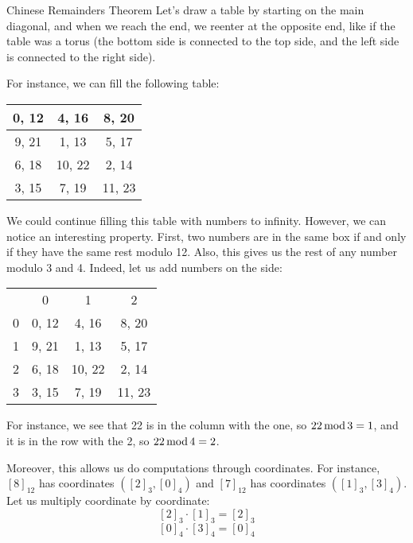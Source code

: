 \documentclass[a4paper]{article}
\begin{document}
\begin{parag}{Chinese Remainders Theorem}
    Let's draw a table by starting on the main diagonal, and when we reach the end, we reenter at the opposite end, like if the table was a torus (the bottom side is connected to the top side, and the left side is connected to the right side).

    For instance, we can fill the following table:
    \begin{center}
    \begin{tabular}{|c|c|c|}
        \hline
        0, 12 & 4, 16 & 8, 20  \\
        \hline
        9, 21 & 1, 13 & 5, 17 \\
        \hline
        6, 18 & 10, 22 & 2, 14 \\
        \hline
        3, 15 & 7, 19 & 11, 23 \\
        \hline
    \end{tabular}
    \end{center}

    We could continue filling this table with numbers to infinity. However, we can notice an interesting property. First, two numbers are in the same box if and only if they have the same rest modulo 12. Also, this gives us the rest of any number modulo 3 and 4. Indeed, let us add numbers on the side:
    \begin{center}
    \begin{tabular}{c||c|c|c|}
        & 0 & 1 & 2  \\
        \hhline{=#=|=|=|}
        0 & 0, 12 & 4, 16 & 8, 20  \\
        \hline
        1 & 9, 21 & 1, 13 & 5, 17 \\
        \hline
        2 & 6, 18 & 10, 22 & 2, 14 \\
        \hline
        3 & 3, 15 & 7, 19 & 11, 23 \\
        \hline
    \end{tabular}
    \end{center}

    For instance, we see that 22 is in the column with the one, so $22 \operatorname{mod} 3 = 1$, and it is in the row with the 2, so $22 \operatorname{mod} 4 = 2$.

    Moreover, this allows us do computations through coordinates. For instance, $\left[8\right]_{12}$ has coordinates $\left(\left[2\right]_3, \left[0\right]_4\right)$ and $\left[7\right]_{12}$ has coordinates $\left(\left[1\right]_3, \left[3\right]_4\right)$. Let us multiply coordinate by coordinate:
    \[\left[2\right]_3 \cdot \left[1\right]_3 = \left[2\right]_3\]
    \[\left[0\right]_4 \cdot \left[3\right]_4 = \left[0\right]_4\]


\end{parag}
\end{document}
